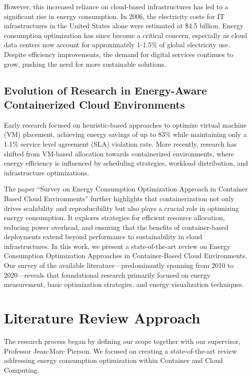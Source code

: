 \documentclass[runningheads]{llncs}
\begin{document}
However, this increased reliance on cloud-based infrastructures has led to a significant rise in energy 
consumption. In 2006, the electricity costs for IT infrastructures in the United States alone were 
estimated at \$4.5 billion\cite{beloglazov_energy_2010}. Energy consumption optimization has since become a 
critical concern, especially as cloud data centers now account for approximately 1-1.5\% of global 
electricity use\cite{IEADataCentres}. Despite efficiency improvements, the demand for digital 
services continues to grow, pushing the need for more sustainable solutions.

\subsection{Evolution of Research in Energy-Aware Containerized Cloud Environments}
Early research focused on heuristic-based approaches to optimize virtual machine (VM) placement, achieving 
energy savings of up to 83\% while maintaining only a 1.1\% service level agreement (SLA) violation 
rate\cite{beloglazov_energy_2010}. More recently, research has shifted from VM-based allocation towards 
containerized environments, where energy efficiency is influenced by scheduling strategies, workload 
distribution, and infrastructure optimizations. 

The paper ``Survey on Energy Consumption Optimization Approach in Container Based Cloud Environments'' 
further highlights that containerization not only drives scalability and 
reproducibility but also plays a crucial role in optimizing energy consumption. It 
explores strategies for efficient resource allocation, reducing power overhead, and 
ensuring that the benefits of container-based deployments extend beyond performance 
to sustainability in cloud infrastructures.
In this work, we present a state-of-the-art review on Energy Consumption Optimization Approaches in 
Container-Based Cloud Environments. Our survey of the available literature—predominantly spanning 
from 2010 to 2020—reveals that foundational research primarily focused on energy measurement, 
basic optimization strategies, and energy visualization techniques\cite{beloglazov_energy_2010}.

\section{Literature Review Approach}
The research process began by defining our scope together with our supervisor, Professor Jean-Marc Pierson. We focused on creating a state-of-the-art review 
addressing energy consumption optimization within Container and Cloud Computing.
\end{document}
